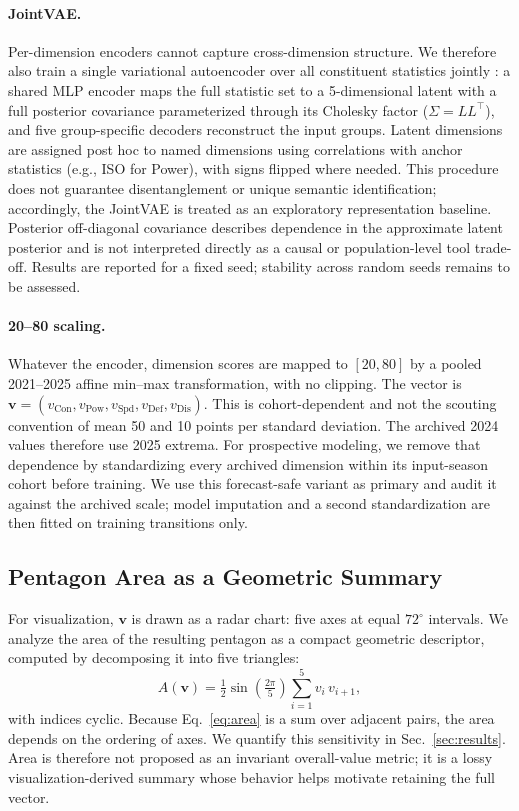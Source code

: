 \documentclass[10pt,twocolumn,letterpaper]{article}
\begin{document}
\paragraph{JointVAE.}
Per-dimension encoders cannot capture cross-dimension structure. We therefore also train a single variational autoencoder over all constituent statistics jointly \cite{kingma2014}: a shared MLP encoder maps the full statistic set to a 5-dimensional latent with a full posterior covariance parameterized through its Cholesky factor ($\Sigma = LL^{\top}$), and five group-specific decoders reconstruct the input groups. Latent dimensions are assigned post hoc to named dimensions using correlations with anchor statistics (e.g., ISO for Power), with signs flipped where needed. This procedure does not guarantee disentanglement or unique semantic identification; accordingly, the JointVAE is treated as an exploratory representation baseline. Posterior off-diagonal covariance describes dependence in the approximate latent posterior and is not interpreted directly as a causal or population-level tool trade-off. Results are reported for a fixed seed; stability across random seeds remains to be assessed.

\paragraph{20--80 scaling.}
Whatever the encoder, dimension scores are mapped to $[20,80]$ by a pooled 2021--2025 affine min--max transformation, with no clipping. The vector is $\mathbf{v}=(v_{\text{Con}},v_{\text{Pow}},v_{\text{Spd}},v_{\text{Def}},v_{\text{Dis}})$. This is cohort-dependent and not the scouting convention of mean 50 and 10 points per standard deviation. The archived 2024 values therefore use 2025 extrema. For prospective modeling, we remove that dependence by standardizing every archived dimension within its input-season cohort before training. We use this forecast-safe variant as primary and audit it against the archived scale; model imputation and a second standardization are then fitted on training transitions only.

\subsection{Pentagon Area as a Geometric Summary}
For visualization, $\mathbf{v}$ is drawn as a radar chart: five axes at equal $72^\circ$ intervals. We analyze the area of the resulting pentagon as a compact geometric descriptor, computed by decomposing it into five triangles:
\begin{equation}
A(\mathbf{v}) = \tfrac{1}{2}\sin\!\left(\tfrac{2\pi}{5}\right) \sum_{i=1}^{5} v_i\, v_{i+1},
\label{eq:area}
\end{equation}
with indices cyclic. Because Eq.~\ref{eq:area} is a sum over adjacent pairs, the area depends on the ordering of axes. We quantify this sensitivity in Sec.~\ref{sec:results}. Area is therefore not proposed as an invariant overall-value metric; it is a lossy visualization-derived summary whose behavior helps motivate retaining the full vector.
\end{document}

